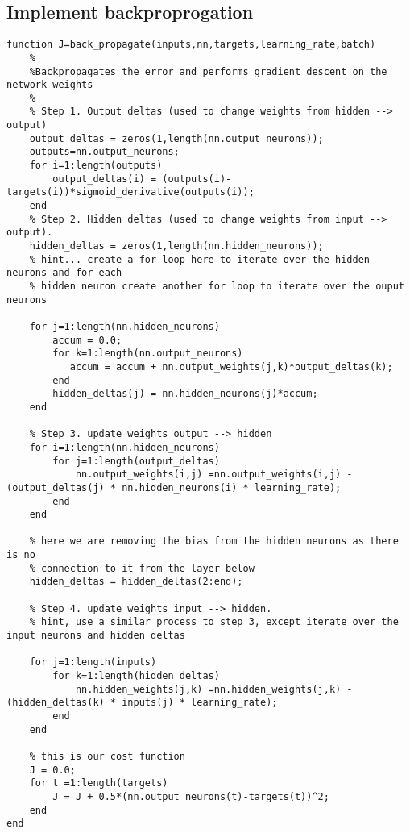 \documentclass[titlepage]{scrartcl}
\begin{document}
\subsection{Implement backproprogation}
\begin{lstlisting}[firstnumber=114]
function J=back_propagate(inputs,nn,targets,learning_rate,batch)
    %
    %Backpropagates the error and performs gradient descent on the network weights
    %
    % Step 1. Output deltas (used to change weights from hidden --> output)
    output_deltas = zeros(1,length(nn.output_neurons));
    outputs=nn.output_neurons;
    for i=1:length(outputs)
        output_deltas(i) = (outputs(i)-targets(i))*sigmoid_derivative(outputs(i));
    end
    % Step 2. Hidden deltas (used to change weights from input --> output).
    hidden_deltas = zeros(1,length(nn.hidden_neurons));
    % hint... create a for loop here to iterate over the hidden neurons and for each
    % hidden neuron create another for loop to iterate over the ouput neurons
    
    for j=1:length(nn.hidden_neurons)
        accum = 0.0;
        for k=1:length(nn.output_neurons)
           accum = accum + nn.output_weights(j,k)*output_deltas(k);
        end
        hidden_deltas(j) = nn.hidden_neurons(j)*accum;
    end

    % Step 3. update weights output --> hidden
    for i=1:length(nn.hidden_neurons)
        for j=1:length(output_deltas)
            nn.output_weights(i,j) =nn.output_weights(i,j) -(output_deltas(j) * nn.hidden_neurons(i) * learning_rate);
        end
    end

    % here we are removing the bias from the hidden neurons as there is no
    % connection to it from the layer below
    hidden_deltas = hidden_deltas(2:end);

    % Step 4. update weights input --> hidden.
    % hint, use a similar process to step 3, except iterate over the input neurons and hidden deltas

    for j=1:length(inputs)
        for k=1:length(hidden_deltas)
            nn.hidden_weights(j,k) =nn.hidden_weights(j,k) -(hidden_deltas(k) * inputs(j) * learning_rate);
        end
    end

    % this is our cost function
    J = 0.0;
    for t =1:length(targets)
        J = J + 0.5*(nn.output_neurons(t)-targets(t))^2;
    end
end
\end{lstlisting}
\end{document}
